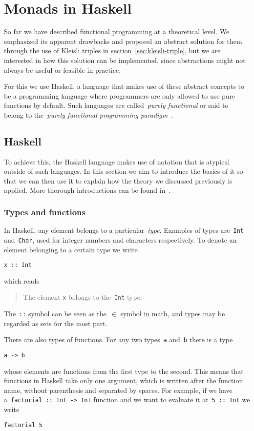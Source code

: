 \documentclass[a4paper]{article}
\theoremstyle{plain}
\theoremstyle{definition}
\begin{document}
\section{Monads in Haskell}
So far we have described functional programming at a theoretical level. We
emphasized its apparent drawbacks and proposed an abstract solution for them
through the use of Kleisli triples in section~\ref{sec:kleisli-triple}, but we
are interested in how this solution can be implemented, since abstractions might
not always be useful or feasible in practice.

For this we use Haskell, a language that makes use of these abstract concepts to
be a programming language where programmers are only allowed to use pure
functions by default. Such languages are called~\emph{purely functional} or said
to belong to the~\emph{purely functional programming
paradigm}~\cite{paradigms-overview}.

\subsection{Haskell}
To achieve this, the Haskell language makes use of notation that is atypical
outside of such languages. In this section we aim to introduce the basics of it
so that we can then use it to explain how the theory we discussed previously is
applied. More thorough introductions can be found in~\cite{haskell-org-docs}.

\subsubsection{Types and functions}
In Haskell, any element belongs to a particular~\emph{type}. Examples of types
are~\texttt{Int} and~\texttt{Char}, used for integer
numbers and characters respectively. To denote an element belonging to a certain
type we write
\begin{verbatim}
x :: Int
\end{verbatim}
which reads
\begin{quote}
    The element \texttt{x} belongs to the~\texttt{Int}
    type.
\end{quote}
The~\texttt{::} symbol can be seen as the~\(\in\) symbol in math,
and types may be regarded as sets for the most part.

There are also types of functions. For any two types~\texttt{a}
and~\texttt{b} there is a type
\begin{verbatim}
a -> b
\end{verbatim}
whose elements are functions from the first type to the second. This means that
functions in Haskell take only one argument, which is written after the function
name, without parenthesis and separated by spaces. For example, if we have
a~\texttt{factorial :: Int -> Int} function and we want to evaluate
it at~\texttt{5 :: Int} we write
\begin{verbatim}
factorial 5
\end{verbatim}
\end{document}
